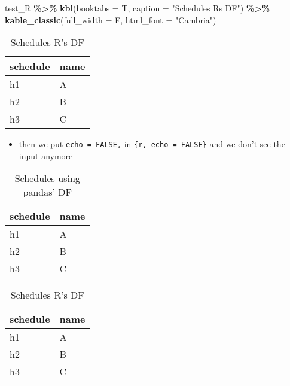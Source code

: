 \documentclass[
]{article}
\newenvironment{Shaded}{\begin{snugshade}}{\end{snugshade}}
\newcommand{\DataTypeTok}[1]{\textcolor[rgb]{0.13,0.29,0.53}{#1}}
\newcommand{\KeywordTok}[1]{\textcolor[rgb]{0.13,0.29,0.53}{\textbf{#1}}}
\newcommand{\NormalTok}[1]{#1}
\newcommand{\OperatorTok}[1]{\textcolor[rgb]{0.81,0.36,0.00}{\textbf{#1}}}
\newcommand{\StringTok}[1]{\textcolor[rgb]{0.31,0.60,0.02}{#1}}
\providecommand{\tightlist}{%
  \setlength{\itemsep}{0pt}\setlength{\parskip}{0pt}}
\begin{document}
\begin{Shaded}
\begin{Highlighting}[]
\NormalTok{test\_R }\OperatorTok{\%\textgreater{}\%}\StringTok{ }
\StringTok{  }\KeywordTok{kbl}\NormalTok{(}\DataTypeTok{booktabs =}\NormalTok{ T,}
      \DataTypeTok{caption =} \StringTok{"Schedules R\textquotesingle{}s DF"}\NormalTok{) }\OperatorTok{\%\textgreater{}\%}
\StringTok{    }\KeywordTok{kable\_classic}\NormalTok{(}\DataTypeTok{full\_width =}\NormalTok{ F, }\DataTypeTok{html\_font =} \StringTok{"Cambria"}\NormalTok{)}
\end{Highlighting}
\end{Shaded}

\begin{table}

\caption{\label{tab:unnamed-chunk-4}Schedules R's DF}
\centering
\begin{tabular}[t]{ll}
\toprule
schedule & name\\
\midrule
h1 & A\\
h2 & B\\
h3 & C\\
\bottomrule
\end{tabular}
\end{table}

\begin{itemize}
\tightlist
\item
  then we put \texttt{echo\ =\ FALSE,} in
  \texttt{\textasciigrave{}\textasciigrave{}\textasciigrave{}\{r,\ echo\ =\ FALSE\}\textasciigrave{}\textasciigrave{}\textasciigrave{}}
  and we don't see the input anymore
\end{itemize}

\begin{table}

\caption{\label{tab:unnamed-chunk-5}Schedules using pandas' DF}
\centering
\begin{tabular}[t]{ll}
\toprule
schedule & name\\
\midrule
h1 & A\\
h2 & B\\
h3 & C\\
\bottomrule
\end{tabular}
\end{table}

\begin{table}

\caption{\label{tab:unnamed-chunk-5}Schedules R's DF}
\centering
\begin{tabular}[t]{ll}
\toprule
schedule & name\\
\midrule
h1 & A\\
h2 & B\\
h3 & C\\
\bottomrule
\end{tabular}
\end{table}
\end{document}
